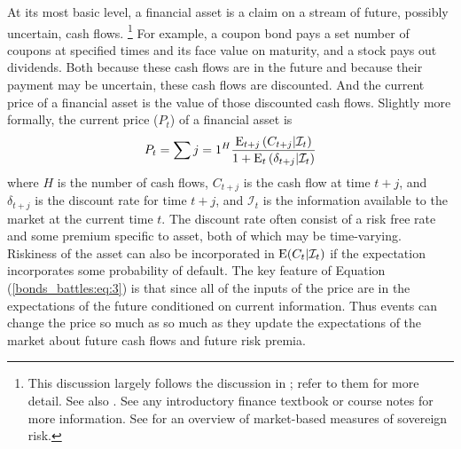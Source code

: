 At its most basic level, a financial asset is a claim on a stream of future, possibly uncertain, cash flows.%
\footnote{
  This discussion largely follows the discussion in \textcite[673]{GuidolinLaFerrara2010}; refer to them for more detail.
  See also \textcite{HaberMitchenerOosterlinckEtAl2015}.
  See any introductory finance textbook or course notes for more information.
  See \textcite{Chan-Lau2006} for an overview of market-based measures of sovereign risk.
}
For example, a coupon bond pays a set number of coupons at specified times and its face value on maturity, and a stock pays out dividends.
Both because these cash flows are in the future and because their payment may be uncertain, these cash flows are discounted.
And the current price of a financial asset is the value of those discounted cash flows.
Slightly more formally, the current price ($P_{t}$) of a financial asset is
\begin{equation}
  \label{bonds_battles:eq:3}
  P_{t} = \sum{j = 1}^{H} \frac{\operatorname{E}_{t + j}\left(C_{t + j} | \mathcal{I}_{t}\right)}{1 + \operatorname{E}_{t}\left(\delta_{t+j} | \mathcal{I}_{t}\right)}
\end{equation}
where $H$ is the number of cash flows, $C_{t + j}$ is the cash flow at time $t + j$, and $\delta_{t + j}$ is the discount rate for time $t + j$, and $\mathcal{I}_{t}$ is the information available to the market at the current time $t$.
The discount rate often consist of a risk free rate and some premium specific to asset, both of which may be time-varying.
Riskiness of the asset can also be incorporated in $\operatorname{E}(C_{t}| \mathcal{I}_{t})$ if the expectation incorporates some probability of default.
The key feature of Equation (\ref{bonds_battles:eq:3}) is that since all of the inputs of the price are in the expectations of the future conditioned on current information.
Thus events can change the price so much as so much as they update the expectations of the market about future cash flows and future risk premia.

